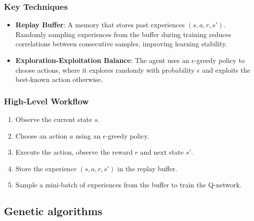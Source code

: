 \documentclass[11pt,a4paper]{article}
\begin{document}
    
            \subsubsection{Key Techniques}
    \begin{itemize}
        \item \textbf{Replay Buffer}: A memory that stores past experiences $(s, a, r, s')$. Randomly sampling experiences from the buffer during training reduces correlations between consecutive samples, improving learning stability.
        \item \textbf{Exploration-Exploitation Balance}: The agent uses an $\epsilon$-greedy policy to choose actions, where it explores randomly with probability $\epsilon$ and exploits the best-known action otherwise.
    \end{itemize}
    
            \subsubsection{High-Level Workflow}
    \begin{enumerate}
        \item Observe the current state $s$.
        \item Choose an action $a$ using an $\epsilon$-greedy policy.
        \item Execute the action, observe the reward $r$ and next state $s'$.
        \item Store the experience $(s, a, r, s')$ in the replay buffer.
        \item Sample a mini-batch of experiences from the buffer to train the Q-network.
    \end{enumerate}
    


	
		\subsection{Genetic algorithms}
\end{document}
